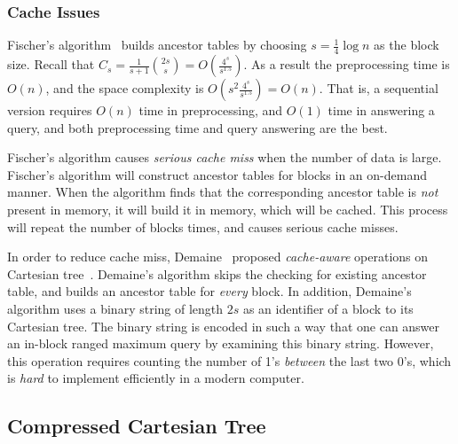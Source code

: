 \subsubsection{Cache Issues}

Fischer's algorithm~\cite{Fischer2006TheoreticalAP} builds ancestor
tables by choosing $s = \frac{1}{4} \log n$ as the block size.  Recall
that $C_s = \frac{1}{s+1}\binom{2s}{s} = O(\frac{4^s}{s^{1.5}})$.  As
a result the preprocessing time is $O(n)$, and the space complexity is
$O(s^2 \frac{4^s}{s^{1.5}}) = O(n)$.  That is, a sequential version
requires $O(n)$ time in preprocessing, and $O(1)$ time in answering a
query, and both preprocessing time and query answering are the best.

Fischer's algorithm causes {\em serious cache miss} when the number of
data is large.  Fischer's algorithm will construct ancestor tables for
blocks in an on-demand manner.  When the algorithm finds that the
corresponding ancestor table is {\em not} present in memory, it will
build it in memory, which will be cached.  This process will repeat
the number of blocks times, and causes serious cache misses.

In order to reduce cache miss, Demaine~\cite{Demaine2009OnCT} proposed
{\em cache-aware} operations on Cartesian
tree~\cite{Vuillemin1980AUL}.  Demaine's algorithm skips the checking
for existing ancestor table, and builds an ancestor table for {\em
  every} block.  In addition, Demaine's algorithm uses a binary string
of length $2s$ as an identifier of a block to its Cartesian tree.  The
binary string is encoded in such a way that one can answer an in-block
ranged maximum query by examining this binary string.  However, this
operation requires counting the number of 1's {\em between} the last
two 0's, which is {\em hard} to implement efficiently in a modern
computer.


\subsection{Compressed Cartesian Tree} \label{sec:cct}

